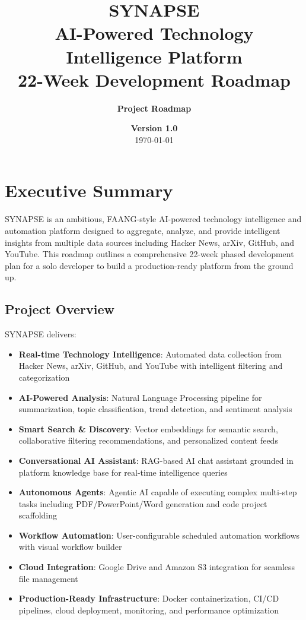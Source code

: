 \documentclass[12pt,oneside]{report}
\title{\huge \textbf{SYNAPSE}\\[0.5cm] \Large AI-Powered Technology Intelligence Platform\\[0.3cm] \normalsize 22-Week Development Roadmap}
\author{\textbf{Project Roadmap}}
\date{\textbf{Version 1.0} \\ \today}
\begin{document}
\maketitle
\thispagestyle{empty}
\newpage

\tableofcontents
\newpage

\chapter{Executive Summary}

SYNAPSE is an ambitious, FAANG-style AI-powered technology intelligence and automation platform designed to aggregate, analyze, and provide intelligent insights from multiple data sources including Hacker News, arXiv, GitHub, and YouTube. This roadmap outlines a comprehensive 22-week phased development plan for a solo developer to build a production-ready platform from the ground up.

\section{Project Overview}

SYNAPSE delivers:
\begin{itemize}
    \item \textbf{Real-time Technology Intelligence}: Automated data collection from Hacker News, arXiv, GitHub, and YouTube with intelligent filtering and categorization
    \item \textbf{AI-Powered Analysis}: Natural Language Processing pipeline for summarization, topic classification, trend detection, and sentiment analysis
    \item \textbf{Smart Search \& Discovery}: Vector embeddings for semantic search, collaborative filtering recommendations, and personalized content feeds
    \item \textbf{Conversational AI Assistant}: RAG-based AI chat assistant grounded in platform knowledge base for real-time intelligence queries
    \item \textbf{Autonomous Agents}: Agentic AI capable of executing complex multi-step tasks including PDF/PowerPoint/Word generation and code project scaffolding
    \item \textbf{Workflow Automation}: User-configurable scheduled automation workflows with visual workflow builder
    \item \textbf{Cloud Integration}: Google Drive and Amazon S3 integration for seamless file management
    \item \textbf{Production-Ready Infrastructure}: Docker containerization, CI/CD pipelines, cloud deployment, monitoring, and performance optimization
\end{itemize}
\end{document}
